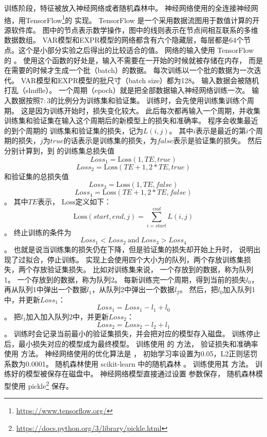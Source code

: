 训练阶段，特征被放入神经网络或者随机森林中。
神经网络使用的全连接神经网络，用TensorFlow\footnote{\url{https://www.tensorflow.org/}}的  实现。
TensorFlow 是一个采用数据流图用于数值计算的开源软件库。
图中的节点表示数学操作，图中的线则表示在节点间相互联系的多维数据数组。
VAR模型和EXPR模型的网络都含有六个隐藏层，每层都是64个节点。这个是小部分实验之后得出的比较适合的值。
网络的输入使用 TensorFlow 的 。
使用这个函数的好处是，输入不需要在一开始的时候就被存储在内存，
而是在需要的时候才生成一个批（batch）的数据。
每次训练以一个批的数据为一次迭代。
VAR模型和EXPR模型的批尺寸（batch size）都为128。
输入数据会被随机打乱（shuffle）。
一个周期（epoch）就是把全部数据输入神经网络训练一次。
输入数据按照$7:3$的比例分为训练集和验证集。
训练时，会先使用训练集训练个周期。
这是因为训练开始时，损失变化较大。
此后每次都再输入一个周期，并收集训练集和验证集在输入这个周期后的新模型上的损失和准确率。
程序会收集最近的到个周期的
训练集和验证集的损失，记为$L(i, j)$。
其中$i$表示是最近的第$i$个周期的损失，$j$为$true$的话表示是训练集的损失，为$false$表示是验证集的损失。
然后分别计算到，到
的训练集总损失值
$$
Loss_1 = \mathrm{Loss}(1, TE, true)
$$
$$
Loss_2 = \mathrm{Loss}(TE + 1, 2 * TE, true)
$$
和验证集的总损失值
$$
Loss_3 = \mathrm{Loss}(1, TE, false)
$$
$$
Loss_4 = \mathrm{Loss}(TE + 1, 2 * TE, false)
$$。
其中$TE$表示，
$\mathrm{Loss}$定义如下：
$$
\mathrm{Loss}(start, end, j) = \sum_{i=start}^{end}{L(i, j)}
$$。
终止训练的条件为
$$
Loss_1 < Loss_2 \ \mathrm{and} \ Loss_3 > Loss_4
$$。
也就是说当训练集的损失仍在下降，但是验证集的损失却开始上升时，
说明出现了过拟合，停止训练。
实现上会使用四个大小为的队列，两个存放训练集损失，两个存放验证集损失。
比如对训练集来说，
一个存放到的数据，称为队列1。
一个存放到的数据，称为队列2。
每新训练完一个周期，得到当前的损失$l_0$，
再从队列1中弹出一个数据$l_1$，从队列2中弹出一个数据$l_2$。
然后，把$l_0$加入队列1中，并更新$Loss_1$：
$$
Loss_1 = Loss_1 - l_1 + l_0
$$。
把$l_1$加入加入队列2中，并更新$Loss_2$：
$$
Loss_2 = Loss_2 - l_2 + l_1
$$。
训练时会记录当前最小的验证集损失，并会把对应的模型存入磁盘。
训练停止后，最小损失对应的模型成为最终模型。
训练使用  的  方法，
验证损失和准确率使用  方法。
神经网络使用的优化算法是 ，
初始学习率设置为0.05，L2正则惩罚系数为0.0001。
随机森林使用 scikit-learn 中的随机森林  。
训练使用其  方法。
训练好的模型被保存在磁盘中。
神经网络模型直接通过设置  参数保存，
随机森林模型使用 pickle\footnote{\url{https://docs.python.org/3/library/pickle.html}} 保存。

